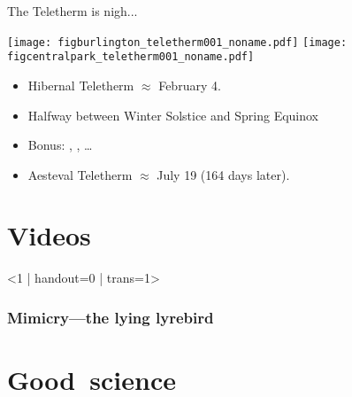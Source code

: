 \begin{frame}

  \begin{block}{The Teletherm is nigh...}
    \begin{center}
    \texttt{[image: figburlington\_teletherm001\_noname.pdf]}
    \texttt{[image: figcentralpark\_teletherm001\_noname.pdf]}
    \end{center}
    \begin{itemize}
    \item 
      Hibernal Teletherm $\approx$ February 4.
    \item 
      Halfway between Winter Solstice and Spring Equinox
    \item 
      Bonus: , 
      , \ldots
    \item 
      Aesteval Teletherm $\approx$ July 19 (164 days later).
    \end{itemize}
  \end{block}

\end{frame}


\section{Videos}

\begin{frame}<1 | handout=0 | trans=1>
  \frametitle{Mimicry---the lying lyrebird}

  \begin{center}
  \end{center}



\end{frame}


\section{Good\ science}

